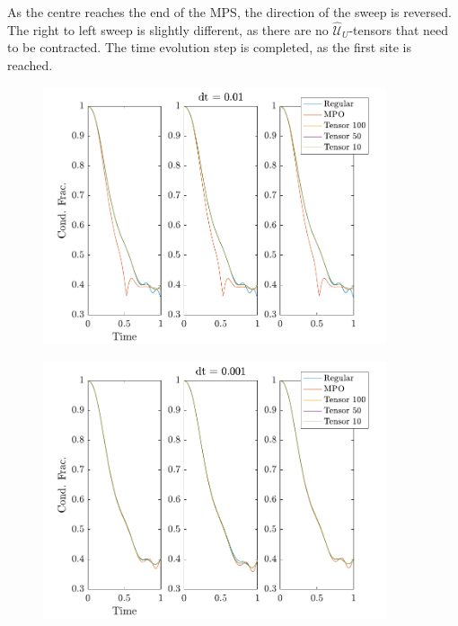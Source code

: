 As the centre reaches the end of the MPS, the direction of the sweep is reversed. The right to left sweep is slightly different, as there are no $\hat{\mathcal{U}}_{U}$-tensors that need to be contracted. The time evolution step is completed, as the first site is reached. 


\begin{figure}[h]
	\centering
	\includegraphics[width=0.9\textwidth]{Figures/TimeEvolve1.pdf}
	\caption{\textit{}}
	\label{fig:TimeEvolve1}
\end{figure}

\begin{figure}[h]
	\centering
	\includegraphics[width=0.9\textwidth]{Figures/TimeEvolve2.pdf}
	\caption{\textit{}}
	\label{fig:TimeEvolve2}
\end{figure}

